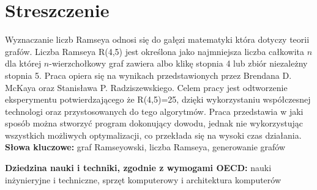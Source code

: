 \chapter*{Streszczenie}
\indent 

Wyznaczanie liczb Ramseya odnosi się do gałęzi matematyki która dotyczy teorii grafów. Liczba Ramseya R(4,5) jest określona jako najmniejsza liczba całkowita $n$ dla której $n$-wierzchołkowy graf zawiera albo klikę stopnia 4 lub zbiór niezależny stopnia 5. Praca opiera się na wynikach przedstawionych przez Brendana D. McKaya oraz Stanisława P. Radziszewskiego. Celem pracy jest odtworzenie eksperymentu potwierdzającego że R(4,5)=25, dzięki wykorzystaniu współczesnej technologi oraz przystosowanych do tego algorytmów. Praca przedstawia w jaki sposób można stworzyć program dokonujący dowodu, jednak nie wykorzystując wszystkich możliwych optymalizacji, co przekłada się na wysoki czas działania.
\vspace{0.5cm}\newline
\textbf{Słowa kluczowe:} graf Ramseyowski, liczba Ramseya, generowanie grafów
\vspace{0.5cm}

\noindent \textbf{Dziedzina nauki i techniki, zgodnie z wymogami OECD:} nauki inżynieryjne i techniczne, sprzęt komputerowy i architektura komputerów
